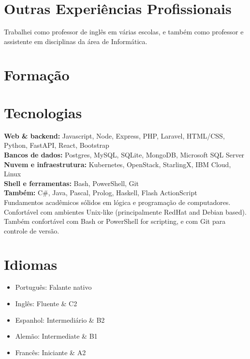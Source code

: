 \documentclass[11pt,a4paper,sans]{moderncv}
\begin{document}
\section{Outras Experiências Profissionais}
Trabalhei como professor de inglês em várias escolas, e também como professor e assistente em disciplinas da área de Informática.

\section{Formação}

\section{Tecnologias}
\textbf{Web \& backend:} Javascript, Node, Express, PHP, Laravel, HTML/CSS, Python, FastAPI, React, Bootstrap\\
\textbf{Bancos de dados:} Postgres, MySQL, SQLite, MongoDB, Microsoft SQL Server\\
\textbf{Nuvem e infraestrutura:} Kubernetes, OpenStack, StarlingX, IBM Cloud, Linux\\
\textbf{Shell e ferramentas:} Bash, PowerShell, Git\\
\textbf{Também:} C\#, Java, Pascal, Prolog, Haskell, Flash ActionScript\\
Fundamentos acadêmicos sólidos em lógica e programação de computadores. Confortável com ambientes Unix-like (principalmente RedHat and Debian based). Também confortável com Bash or PowerShell for scripting, e com Git para controle de versão.

\section{Idiomas}
\begin{itemize}
\item Português: Falante nativo
\item Inglês: Fluente \& C2
\item Espanhol: Intermediário \& B2
\item Alemão: Intermediate \& B1
\item Francês: Iniciante \& A2
\end{itemize}
\end{document}
